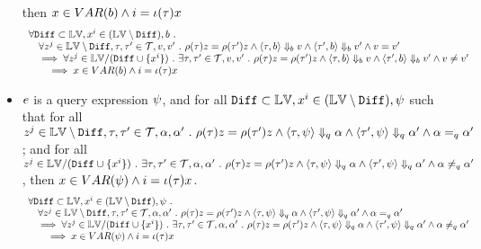 \begin{lem}
\begin{itemize}
	then 
	 $x \in VAR(b) \land i = \iota(\mathtt{\tau}) x$
	\[
		\begin{array}{l}
		\forall \mathtt{Diff} \subset \mathbb{LV},  x^i \in (\mathbb{LV} \setminus \mathtt{Diff}), b ~.~ 
		\\ \quad
		\forall z^j \in \mathbb{LV} \setminus \mathtt{Diff}, \mathtt{\tau}, \mathtt{\tau}' \in \mathcal{T}, v, v' ~.~  
		\rho(\mathtt{\tau}) z = \rho(\mathtt{\tau}') z \land 
		\langle \mathtt{\tau}, b \rangle \Downarrow_b v \land \langle \mathtt{\tau}', b \rangle \Downarrow_b v' \land v = v'
		\\ \quad
		\implies 
		\forall z^j \in \mathbb{LV} / (\mathtt{Diff} \cup \{x^i\} ) ~.~  
		 \exists \mathtt{\tau}, \mathtt{\tau}' \in \mathcal{T}, v, v' ~.~  
		\rho(\mathtt{\tau}) z = \rho(\mathtt{\tau}') z \land 
		\langle \mathtt{\tau}, b \rangle \Downarrow_b v \land \langle \mathtt{\tau}', b \rangle \Downarrow_b v' \land v \neq v'
		\\ \qquad
		\implies x \in VAR(b) \land i = \iota(\mathtt{\tau}) x
		\end{array}
	\]
% 
	\item $e$ is a query expression $\psi$,
	and for all $\mathtt{Diff} \subset \mathbb{LV},  x^i \in (\mathbb{LV} \setminus \mathtt{Diff}), \psi$ such that 
	for all $ z^j \in \mathbb{LV} \setminus \mathtt{Diff}, \mathtt{\tau}, \mathtt{\tau}' \in \mathcal{T}, \alpha, \alpha' ~.~  
 \rho(\mathtt{\tau}) z = \rho(\mathtt{\tau}') z \land 
 \langle \mathtt{\tau}, \psi \rangle \Downarrow_q \alpha \land \langle \mathtt{\tau}', \psi \rangle \Downarrow_q \alpha' \land \alpha =_q \alpha'$;
 and for all 
	$ z^j \in \mathbb{LV} / (\mathtt{Diff} \cup \{x^i\} ) ~.~  
  \exists \mathtt{\tau}, \mathtt{\tau}' \in \mathcal{T}, \alpha, \alpha' ~.~  
 \rho(\mathtt{\tau}) z = \rho(\mathtt{\tau}') z \land 
 \langle \mathtt{\tau}, \psi \rangle \Downarrow_q \alpha \land \langle \mathtt{\tau}', \psi \rangle \Downarrow_q \alpha' \land \alpha \neq_{q} \alpha'$,
 then  $x \in VAR(\psi) \land i = \iota(\mathtt{\tau}) x$.
	\[
		\begin{array}{l}
		\forall \mathtt{Diff} \subset \mathbb{LV},  x^i \in (\mathbb{LV} \setminus \mathtt{Diff}), \psi ~.~ 
		\\ \quad
		\forall z^j \in \mathbb{LV} \setminus \mathtt{Diff}, \mathtt{\tau}, \mathtt{\tau}' \in \mathcal{T}, \alpha, \alpha' ~.~  
		\rho(\mathtt{\tau}) z = \rho(\mathtt{\tau}') z \land 
		\langle \mathtt{\tau}, \psi \rangle \Downarrow_q \alpha \land \langle \mathtt{\tau}', \psi \rangle \Downarrow_q \alpha' \land \alpha =_q \alpha'
		\\ \quad
		\implies 
		\forall z^j \in \mathbb{LV} / (\mathtt{Diff} \cup \{x^i\} ) ~.~  
		 \exists \mathtt{\tau}, \mathtt{\tau}' \in \mathcal{T}, \alpha, \alpha' ~.~  
		\rho(\mathtt{\tau}) z = \rho(\mathtt{\tau}') z \land 
		\langle \mathtt{\tau}, \psi \rangle \Downarrow_q \alpha \land \langle \mathtt{\tau}', \psi \rangle \Downarrow_q \alpha' \land \alpha \neq_{q} \alpha'
		\\ \qquad
		\implies x \in VAR(\psi) \land i = \iota(\mathtt{\tau}) x
		\end{array}
	\]
	\end{itemize}
	\end{lem}
